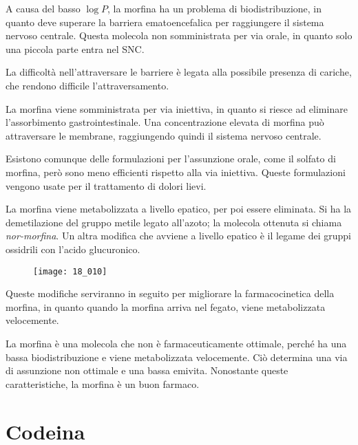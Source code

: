 \newpage


A causa del basso \(\log{} P\), la morfina ha un problema di
biodistribuzione, in quanto deve superare la barriera ematoencefalica
per raggiungere il sistema nervoso centrale. Questa molecola non
somministrata per via orale, in quanto solo una piccola parte entra nel
SNC.

La difficoltà nell'attraversare le barriere è legata alla possibile
presenza di cariche, che rendono difficile l'attraversamento.

La morfina viene somministrata per via iniettiva, in quanto si riesce ad
eliminare l'assorbimento gastrointestinale. Una concentrazione elevata
di morfina può attraversare le membrane, raggiungendo quindi il sistema
nervoso centrale.

Esistono comunque delle formulazioni per l'assunzione orale, come il
solfato di morfina, però sono meno efficienti rispetto alla via
iniettiva. Queste formulazioni vengono usate per il trattamento di
dolori lievi.

La morfina viene metabolizzata a livello epatico, per poi essere
eliminata. Si ha la demetilazione del gruppo metile legato all'azoto; la
molecola ottenuta si chiama \emph{nor-morfina}. Un altra modifica che
avviene a livello epatico è il legame dei gruppi ossidrili con l'acido
glucuronico.
\begin{figure}[H]
  \centering
  \texttt{[image: 18\_010]}
\end{figure}


Queste modifiche serviranno in seguito per migliorare la farmacocinetica
della morfina, in quanto quando la morfina arriva nel fegato, viene
metabolizzata velocemente.

La morfina è una molecola che non è farmaceuticamente ottimale, perché
ha una bassa biodistribuzione e viene metabolizzata velocemente. Ciò
determina una via di assunzione non ottimale e una bassa emivita.
Nonostante queste caratteristiche, la morfina è un buon farmaco.

\section{Codeina}

